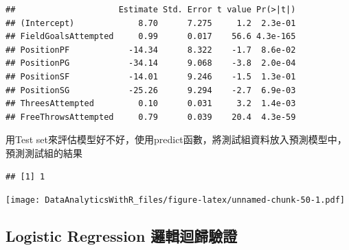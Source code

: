 \documentclass[
]{book}
\newenvironment{Shaded}{\begin{snugshade}}{\end{snugshade}}
\newcommand{\CommentTok}[1]{\textcolor[rgb]{0.56,0.35,0.01}{\textit{#1}}}
\newcommand{\DataTypeTok}[1]{\textcolor[rgb]{0.13,0.29,0.53}{#1}}
\newcommand{\KeywordTok}[1]{\textcolor[rgb]{0.13,0.29,0.53}{\textbf{#1}}}
\newcommand{\NormalTok}[1]{#1}
\newcommand{\OperatorTok}[1]{\textcolor[rgb]{0.81,0.36,0.00}{\textbf{#1}}}
\begin{document}
\begin{verbatim}
##                     Estimate Std. Error t value Pr(>|t|)
## (Intercept)             8.70      7.275     1.2  2.3e-01
## FieldGoalsAttempted     0.99      0.017    56.6 4.3e-165
## PositionPF            -14.34      8.322    -1.7  8.6e-02
## PositionPG            -34.14      9.068    -3.8  2.0e-04
## PositionSF            -14.01      9.246    -1.5  1.3e-01
## PositionSG            -25.26      9.294    -2.7  6.9e-03
## ThreesAttempted         0.10      0.031     3.2  1.4e-03
## FreeThrowsAttempted     0.79      0.039    20.4  4.3e-59
\end{verbatim}

用Test set來評估模型好不好，使用predict函數，將測試組資料放入預測模型中，預測測試組的結果

\begin{Shaded}
\end{Shaded}

\begin{verbatim}
## [1] 1
\end{verbatim}

\begin{Shaded}
\end{Shaded}

\texttt{[image: DataAnalyticsWithR\_files/figure-latex/unnamed-chunk-50-1.pdf]}

\hypertarget{logistic-regression-ux908fux8f2fux8ff4ux6b78ux9a57ux8b49}{%
\subsection{Logistic Regression 邏輯迴歸驗證}\label{logistic-regression-ux908fux8f2fux8ff4ux6b78ux9a57ux8b49}}
\end{document}
